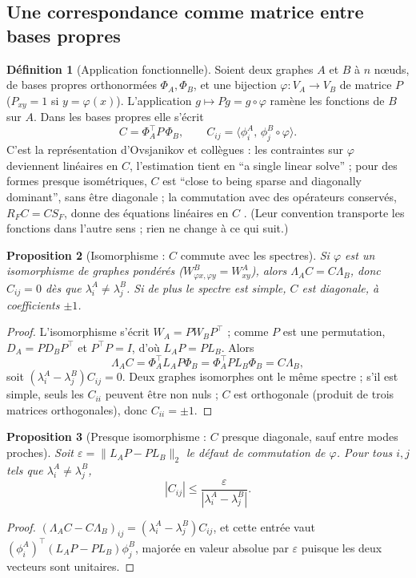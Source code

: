 \documentclass[11pt,a4paper]{article}
\theoremstyle{definition}
\newtheorem{definition}{Définition}[section]
\theoremstyle{plain}
\newtheorem{proposition}[definition]{Proposition}
\begin{document}
\subsection{Une correspondance comme matrice entre bases propres}

\begin{definition}[Application fonctionnelle]
\label{def:fmap}
Soient deux graphes $A$ et $B$ à $n$ nœuds, de bases propres orthonormées $\Phi_A,\Phi_B$, et une
bijection $\varphi:V_A\to V_B$ de matrice $P$ ($P_{xy}=1$ si $y=\varphi(x)$). L'application
$g\mapsto Pg=g\circ\varphi$ ramène les fonctions de $B$ sur $A$. Dans les bases propres elle s'écrit
\[ C=\Phi_A^\top P\,\Phi_B,\qquad C_{ij}=\langle\phi^A_i,\,\phi^B_j\circ\varphi\rangle . \]
C'est la représentation d'Ovsjanikov et collègues \cite{ovsjanikov2012} : les contraintes sur
$\varphi$ deviennent linéaires en $C$, l'estimation tient en \enquote{a single linear solve}
\cite[p.~1-2]{ovsjanikov2012} ; pour des formes presque isométriques, $C$ est \enquote{close to being
sparse and diagonally dominant}, sans être diagonale \cite[p.~3]{ovsjanikov2012} ; la commutation
avec des opérateurs conservés, $R_FC=CS_F$, donne des équations linéaires en $C$
\cite[p.~6]{ovsjanikov2012}. (Leur convention transporte les fonctions dans l'autre sens ; rien
ne change à ce qui suit.)
\end{definition}

\begin{proposition}[Isomorphisme : $C$ commute avec les spectres]
\label{prop:fmapiso}
Si $\varphi$ est un isomorphisme de graphes pondérés ($W^B_{\varphi x,\varphi y}=W^A_{xy}$), alors
$\Lambda_AC=C\Lambda_B$, donc $C_{ij}=0$ dès que $\lambda^A_i\ne\lambda^B_j$. Si de plus le spectre est
simple, $C$ est diagonale, à coefficients $\pm1$.
\end{proposition}
\begin{proof}
L'isomorphisme s'écrit $W_A=PW_BP^\top$ ; comme $P$ est une permutation, $D_A=PD_BP^\top$ et
$P^\top P=I$, d'où $L_AP=PL_B$. Alors
\[ \Lambda_AC=\Phi_A^\top L_AP\Phi_B=\Phi_A^\top PL_B\Phi_B=C\Lambda_B, \]
soit $(\lambda^A_i-\lambda^B_j)C_{ij}=0$. Deux graphes isomorphes ont le même spectre ; s'il est simple,
seuls les $C_{ii}$ peuvent être non nuls ; $C$ est orthogonale (produit de trois matrices
orthogonales), donc $C_{ii}=\pm1$.
\end{proof}

\begin{proposition}[Presque isomorphisme : $C$ presque diagonale, sauf entre modes proches]
\label{prop:fmapproche}
Soit $\varepsilon=\|L_AP-PL_B\|_2$ le défaut de commutation de $\varphi$. Pour tous $i,j$ tels que
$\lambda^A_i\ne\lambda^B_j$,
\[ |C_{ij}|\le\frac{\varepsilon}{|\lambda^A_i-\lambda^B_j|}. \]
\end{proposition}
\begin{proof}
$(\Lambda_AC-C\Lambda_B)_{ij}=(\lambda^A_i-\lambda^B_j)C_{ij}$, et cette entrée vaut
$(\phi^A_i)^\top(L_AP-PL_B)\phi^B_j$, majorée en valeur absolue par $\varepsilon$ puisque les deux
vecteurs sont unitaires.
\end{proof}
\end{document}

